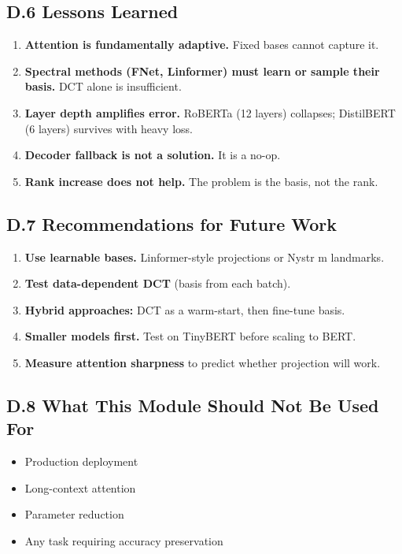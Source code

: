 \subsection{D.6 Lessons Learned}

\begin{enumerate}
\item \textbf{Attention is fundamentally adaptive.} Fixed bases cannot capture it.
\item \textbf{Spectral methods (FNet, Linformer) must learn or sample their basis.}
  DCT alone is insufficient.
\item \textbf{Layer depth amplifies error.} RoBERTa (12 layers) collapses; DistilBERT
  (6 layers) survives with heavy loss.
\item \textbf{Decoder fallback is not a solution.} It is a no-op.
\item \textbf{Rank increase does not help.} The problem is the basis, not the rank.

\end{enumerate}
\subsection{D.7 Recommendations for Future Work}

\begin{enumerate}
\item \textbf{Use learnable bases.} Linformer-style projections or Nystr m landmarks.
\item \textbf{Test data-dependent DCT} (basis from each batch).
\item \textbf{Hybrid approaches:} DCT as a warm-start, then fine-tune basis.
\item \textbf{Smaller models first.} Test on TinyBERT before scaling to BERT.
\item \textbf{Measure attention sharpness} to predict whether projection will work.

\end{enumerate}
\subsection{D.8 What This Module Should Not Be Used For}

\begin{itemize}
\item Production deployment
\item Long-context attention
\item Parameter reduction
\item Any task requiring accuracy preservation

\end{itemize}
